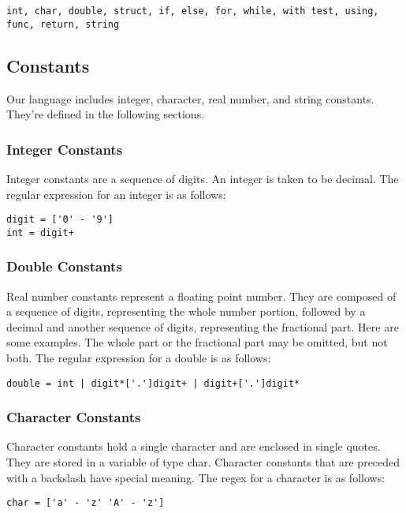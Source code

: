 \documentclass{article}
\begin{document}
\texttt{int, char, double, struct, if, else, for, while, with test, using, func, return, string}

\subsection{Constants}
Our language includes integer, character, real number, and string constants. They're defined in the following sections.

\subsubsection{Integer Constants}
Integer constants are a sequence of digits. An integer is taken to be decimal. The regular expression for an integer is as follows:

\begin{Verbatim}[frame=single]
digit = ['0' - '9']
int = digit+
\end{Verbatim}

\subsubsection{Double Constants}
Real number constants represent a floating point number. They are composed of a sequence of digits, representing the whole number portion, followed by a decimal and another sequence of digits, representing the fractional part. Here are some examples. The whole part or the fractional part may be omitted, but not both.  The regular expression for a double is as follows:

\begin{Verbatim}[frame=single]
double = int | digit*['.']digit+ | digit+['.']digit*
\end{Verbatim}

\subsubsection{Character Constants}
Character constants hold a single character and are enclosed in single quotes. They are stored in a variable of type char. Character constants that are preceded with a backslash have special meaning. The regex for a character is as follows:

\begin{Verbatim}[frame=single]
char = ['a' - 'z' 'A' - 'z']
\end{Verbatim}
\end{document}
